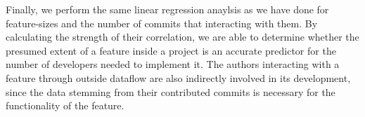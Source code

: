 Finally, we perform the same linear regression anaylsis as we have done for feature-sizes and the number of commits that interacting with them.
By calculating the strength of their correlation, we are able to determine whether the presumed extent of a feature inside a project is an accurate predictor for the number of developers needed to implement it.
The authors interacting with a feature through outside dataflow are also indirectly involved in its development, since the data stemming from their contributed commits is necessary for the functionality of the feature.
